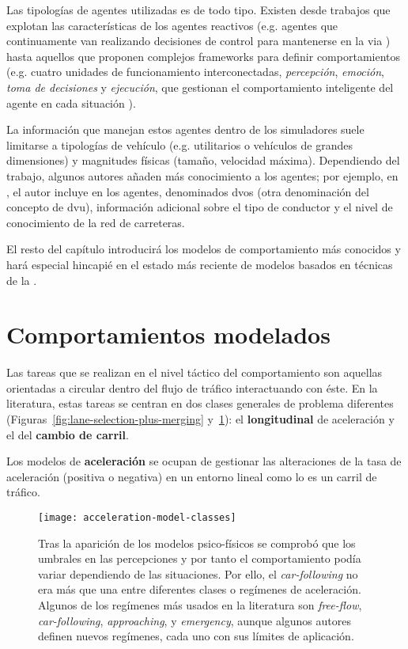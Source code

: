 Las tipologías de agentes utilizadas es de todo tipo. Existen desde trabajos que explotan las características de los agentes reactivos (e.g. agentes que continuamente van realizando decisiones de control para mantenerse en la via \cite{Ehlert2001}) hasta aquellos que proponen complejos frameworks para definir comportamientos (e.g. cuatro unidades de funcionamiento interconectadas, \textit{percepción}, \textit{emoción}, \textit{toma de decisiones} y \textit{ejecución}, que gestionan el comportamiento inteligente del agente en cada situación \cite{al2001framework}).

La información que manejan estos agentes dentro de los simuladores suele limitarse a tipologías de vehículo (e.g. utilitarios o vehículos de grandes dimensiones) y magnitudes físicas (tamaño, velocidad máxima). Dependiendo del trabajo, algunos autores añaden más conocimiento a los agentes; por ejemplo, en \cite{hidas2002}, el autor incluye en los agentes, denominados \glspl{dvo} (otra denominación del concepto de \gls{dvu}), información adicional sobre el tipo de conductor y el nivel de conocimiento de la red de carreteras.

El resto del capítulo introducirá los modelos de comportamiento más conocidos y hará especial hincapié en el estado más reciente de modelos basados en técnicas de la .

\section{Comportamientos modelados}

Las tareas que se realizan en el nivel táctico del comportamiento son aquellas orientadas a circular dentro del flujo de tráfico interactuando con éste. En la literatura, estas tareas se centran en dos clases generales de problema diferentes (Figuras~\ref{fig:lane-selection-plus-merging} y~\ref{fig:acceleration-model-classes}): el \textbf{longitudinal} de aceleración y el del \textbf{cambio de carril}.

Los modelos de \textbf{aceleración} se ocupan de gestionar las alteraciones de la tasa de aceleración (positiva o negativa) en un entorno lineal como lo es un carril de tráfico.

\begin{figure}[t]
	\centering
	\texttt{[image: acceleration-model-classes]}
	\caption[Diferentes modelos de aceleración]{Tras la aparición de los modelos psico-físicos se comprobó que los umbrales en las percepciones y por tanto el comportamiento podía variar dependiendo de las situaciones. Por ello, el \textit{\gls{car-following}} no era más que una entre diferentes clases o regímenes de aceleración. Algunos de los regímenes más usados en la literatura son \textit{free-flow}, \textit{\gls{car-following}}, \textit{approaching}, y \textit{emergency}, aunque algunos autores definen nuevos regímenes, cada uno con sus límites de aplicación.}
	\label{fig:acceleration-model-classes}
\end{figure}

